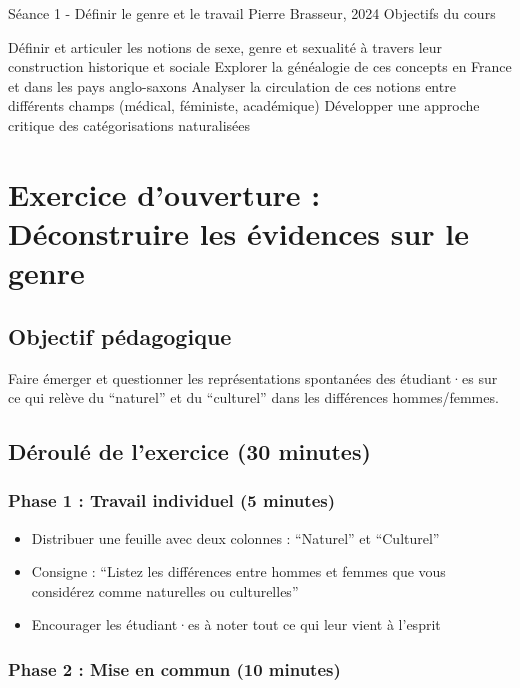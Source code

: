 \documentclass[
  letterpaper,
  DIV=11,
  numbers=noendperiod]{scrreprt}
\providecommand{\tightlist}{%
  \setlength{\itemsep}{0pt}\setlength{\parskip}{0pt}}\usepackage{longtable,booktabs,array}
\begin{document}
Séance 1 - Définir le genre et le travail Pierre Brasseur, 2024
Objectifs du cours

Définir et articuler les notions de sexe, genre et sexualité à travers
leur construction historique et sociale Explorer la généalogie de ces
concepts en France et dans les pays anglo-saxons Analyser la circulation
de ces notions entre différents champs (médical, féministe, académique)
Développer une approche critique des catégorisations naturalisées


\chapter{Exercice d'ouverture : Déconstruire les évidences sur le
genre}\label{exercice-douverture-duxe9construire-les-uxe9vidences-sur-le-genre}

\section{Objectif pédagogique}\label{objectif-puxe9dagogique}

Faire émerger et questionner les représentations spontanées des
étudiant·es sur ce qui relève du ``naturel'' et du ``culturel'' dans les
différences hommes/femmes.

\section{Déroulé de l'exercice (30
minutes)}\label{duxe9rouluxe9-de-lexercice-30-minutes}

\subsection{Phase 1 : Travail individuel (5
minutes)}\label{phase-1-travail-individuel-5-minutes}

\begin{itemize}
\tightlist
\item
  Distribuer une feuille avec deux colonnes : ``Naturel'' et
  ``Culturel''
\item
  Consigne : ``Listez les différences entre hommes et femmes que vous
  considérez comme naturelles ou culturelles''
\item
  Encourager les étudiant·es à noter tout ce qui leur vient à l'esprit
\end{itemize}

\subsection{Phase 2 : Mise en commun (10
minutes)}\label{phase-2-mise-en-commun-10-minutes}
\end{document}
